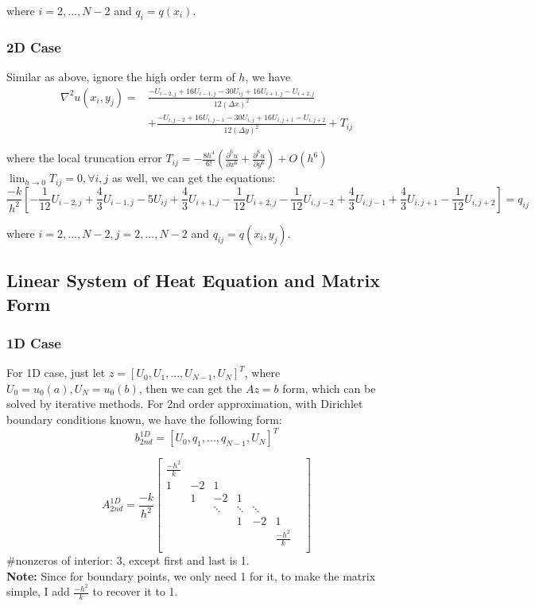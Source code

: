 \documentclass[a4paper]{article}
\begin{document}
where $ i = 2,...,N-2$ and $q_{i} = q(x_i)$. 

\subsubsection{2D Case}
Similar as above, ignore the high order term of $h$, we have 
\begin{equation}
    \begin{split}
    \nabla^2 u(x_i, y_j) =  & \frac{-U_{i-2,j} + 16U_{i-1,j} - 30U_{ij} + 16 U_{i+1,j} - U_{i+2,j}}{12(\Delta x)^2}\\
    & + \frac{-U_{i,j-2} + 16 U_{i,j-1} - 30 U_{i,j} + 16U_{i,j+1} -U_{i, j+2} }{12(\Delta y)^2}  + T_{ij}
    \end{split}
\end{equation}

where the local truncation error $T_{ij} = -\frac{8h^4}{6!}(\frac{\partial^6 u}{\partial x^6} + \frac{\partial^6 u}{\partial y^6}) + O(h^6) $ $\lim_{h\rightarrow 0} T_{ij} = 0, \forall i,j$ as well, we can get the equations:
\begin{equation}
    \frac{-k}{h^2}[ -\frac{1}{12}U_{i-2,j} + \frac{4}{3}U_{i-1,j} - 5U_{ij} + \frac{4}{3} U_{i+1,j} - \frac{1}{12}U_{i+2,j} -\frac{1}{12}U_{i,j-2} + \frac{4}{3} U_{i,j-1} + \frac{4}{3}U_{i,j+1} -\frac{1}{12}U_{i, j+2}] = q_{ij}
\end{equation}

where $ i = 2,...,N-2, j = 2,...,N-2$ and $q_{ij} = q(x_i,y_j)$.

\subsection{Linear System of Heat Equation and Matrix Form}
\subsubsection{1D Case}
For 1D case, just let $z=[U_0, U_1,...,U_{N-1},U_N]^T$, where $U_0=u_0(a), U_N=u_0(b)$, then we can get the $Az = b$ form, which can be solved by iterative methods. For 2nd order approximation, with Dirichlet boundary conditions known, we have the following form:
$$b_{2nd}^{1D} = [ U_0, q_1,...,q_{N-1}, U_N ]^T$$

\[
A_{2nd}^{1D}
= \frac{-k}{h^2}
\begin{bmatrix}
    
    \frac{-h^2}{k}  &  &   & & & \\
    1  & -2 & 1  &   &  &\\
       & 1  & -2 & 1  &  & \\
     & & \ddots & \ddots & \ddots & & \\
     & & & 1 & -2  & 1&\\
     & & &  &  & \frac{-h^2}{k} \\
\end{bmatrix}
\]
\#nonzeros of interior: 3, except first and last is 1.  \\
\textbf{Note:} Since for boundary points, we only need 1 for it, to make the matrix simple, I add $\frac{-h^2}{k}$ to recover it to 1.
\end{document}
